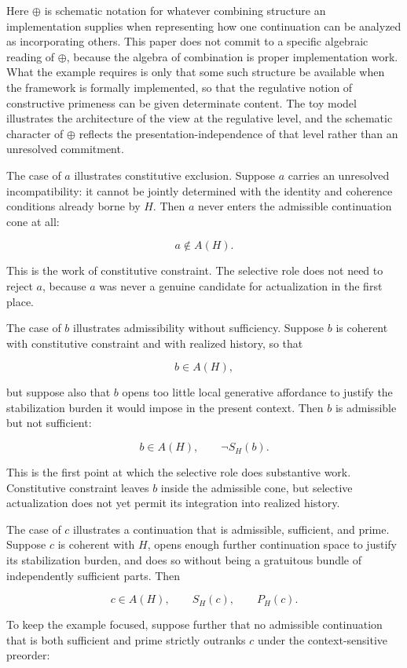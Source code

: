 \documentclass[11pt]{article}
\theoremstyle{foundation}
\begin{document}
Here $\oplus$ is schematic notation for whatever combining structure an implementation supplies when representing how one continuation can be analyzed as incorporating others. This paper does not commit to a specific algebraic reading of $\oplus$, because the algebra of combination is proper implementation work. What the example requires is only that some such structure be available when the framework is formally implemented, so that the regulative notion of constructive primeness can be given determinate content. The toy model illustrates the architecture of the view at the regulative level, and the schematic character of $\oplus$ reflects the presentation-independence of that level rather than an unresolved commitment.

The case of $a$ illustrates constitutive exclusion. Suppose $a$ carries an unresolved incompatibility: it cannot be jointly determined with the identity and coherence conditions already borne by $H$. Then $a$ never enters the admissible continuation cone at all:

\[
a \notin A(H).
\]

This is the work of constitutive constraint. The selective role does not need to reject $a$, because $a$ was never a genuine candidate for actualization in the first place.

The case of $b$ illustrates admissibility without sufficiency. Suppose $b$ is coherent with constitutive constraint and with realized history, so that

\[
b \in A(H),
\]

but suppose also that $b$ opens too little local generative affordance to justify the stabilization burden it would impose in the present context. Then $b$ is admissible but not sufficient:

\[
b \in A(H), \qquad \neg S_H(b).
\]

This is the first point at which the selective role does substantive work. Constitutive constraint leaves $b$ inside the admissible cone, but selective actualization does not yet permit its integration into realized history.

The case of $c$ illustrates a continuation that is admissible, sufficient, and prime. Suppose $c$ is coherent with $H$, opens enough further continuation space to justify its stabilization burden, and does so without being a gratuitous bundle of independently sufficient parts. Then

\[
c \in A(H), \qquad S_H(c), \qquad P_H(c).
\]

To keep the example focused, suppose further that no admissible continuation that is both sufficient and prime strictly outranks $c$ under the context-sensitive preorder:
\end{document}
